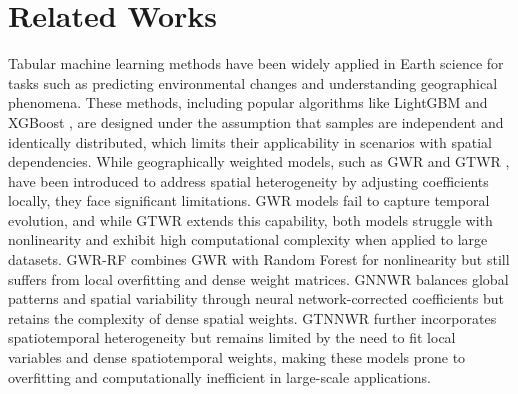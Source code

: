 \section{Related Works}
Tabular machine learning methods have been widely applied in Earth science for tasks such as predicting environmental changes and understanding geographical phenomena. These methods, including popular algorithms like LightGBM \citep{ke2017lightgbm} and XGBoost \citep{chen2016xgboost}, are designed under the assumption that samples are independent and identically distributed, which limits their applicability in scenarios with spatial dependencies. While geographically weighted models, such as GWR \citep{fotheringham2009geographically} and GTWR \citep{fotheringham2015geographical}, have been introduced to address spatial heterogeneity by adjusting coefficients locally, they face significant limitations. GWR models fail to capture temporal evolution, and while GTWR extends this capability, both models struggle with nonlinearity and exhibit high computational complexity when applied to large datasets. GWR-RF \citep{wang2024geographically} combines GWR with Random Forest for nonlinearity but still suffers from local overfitting and dense weight matrices. GNNWR \citep{du2020geographically} balances global patterns and spatial variability through neural network-corrected coefficients but retains the complexity of dense spatial weights. GTNNWR \citep{wu2021geographically} further incorporates spatiotemporal heterogeneity but remains limited by the need to fit local variables and dense spatiotemporal weights, making these models prone to overfitting and computationally inefficient in large-scale applications.